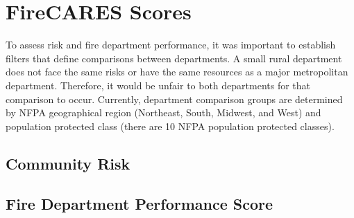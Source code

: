 \documentclass[12pt,oneside]{book}
\begin{document}



\newpage

\cleardoublepage



\renewcommand*\contentsname{\color{fc_blue}Contents}
\tableofcontents

\hypersetup{ 
    linkcolor=fc_orange,         %
    filecolor=fc_orange,      %
    urlcolor=fc_orange,           %
}    

\newpage
\mainmatter


\chapter{FireCARES Scores}

To assess risk and fire department performance, it was important to establish filters that define comparisons between departments. A small rural department does not face the same risks or have the same resources as a major metropolitan department. Therefore, it would be unfair to both departments for that comparison to occur. Currently, department comparison groups are determined by NFPA geographical region (Northeast, South, Midwest, and West) and population protected class (there are 10 NFPA population protected classes).

\section{Community Risk}


\section{Fire Department Performance Score}
\end{document}
